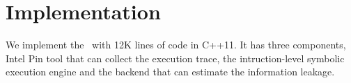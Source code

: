 \section{Implementation}
We implement the \tana\ with 12K lines of code in C++11. It has three components, Intel
Pin tool that can collect the execution trace, the intruction-level symbolic execution
engine and the backend that can estimate the information leakage. 
